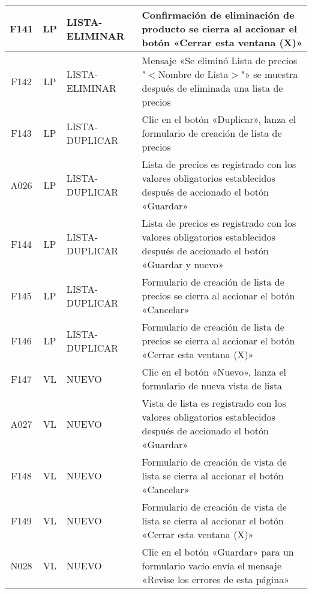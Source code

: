 \begin{landscape}
{\begin{longtable}[htb]{|c|c|p{3.8cm}|p{15.2cm}|}
\scriptsize{F141} & \scriptsize{LP} & \scriptsize{LISTA-ELIMINAR} & \scriptsize{Confirmación de eliminación de producto se cierra al accionar el botón «Cerrar esta ventana (X)»} \\ \hline
\scriptsize{F142} & \scriptsize{LP} & \scriptsize{LISTA-ELIMINAR} & \scriptsize{Mensaje «Se eliminó Lista de precios "$<$Nombre de Lista$>$"» se muestra después de eliminada una lista de precios} \\ \hline
\scriptsize{F143} & \scriptsize{LP} & \scriptsize{LISTA-DUPLICAR} & \scriptsize{Clic en el botón «Duplicar», lanza el formulario de creación de lista de precios} \\ \hline
\scriptsize{A026} & \scriptsize{LP} & \scriptsize{LISTA-DUPLICAR} & \scriptsize{Lista de precios es registrado con los valores obligatorios establecidos después de accionado el botón «Guardar»} \\ \hline
\scriptsize{F144} & \scriptsize{LP} & \scriptsize{LISTA-DUPLICAR} & \scriptsize{Lista de precios es registrado con los valores obligatorios establecidos después de accionado el botón «Guardar y nuevo»} \\ \hline
\scriptsize{F145} & \scriptsize{LP} & \scriptsize{LISTA-DUPLICAR} & \scriptsize{Formulario de creación de lista de precios se cierra al accionar el botón «Cancelar»} \\ \hline
\scriptsize{F146} & \scriptsize{LP} & \scriptsize{LISTA-DUPLICAR} & \scriptsize{Formulario de creación de lista de precios se cierra al accionar el botón «Cerrar esta ventana (X)»} \\ \hline
\scriptsize{F147} & \scriptsize{VL} & \scriptsize{NUEVO} & \scriptsize{Clic en el botón «Nuevo», lanza el formulario de nueva vista de lista} \\ \hline
\scriptsize{A027} & \scriptsize{VL} & \scriptsize{NUEVO} & \scriptsize{Vista de lista es registrado con los valores obligatorios establecidos después de accionado el botón «Guardar»} \\ \hline
\scriptsize{F148} & \scriptsize{VL} & \scriptsize{NUEVO} & \scriptsize{Formulario de creación de vista de lista se cierra al accionar el botón «Cancelar»} \\ \hline
\scriptsize{F149} & \scriptsize{VL} & \scriptsize{NUEVO} & \scriptsize{Formulario de creación de vista de lista se cierra al accionar el botón «Cerrar esta ventana (X)»} \\ \hline
\scriptsize{N028} & \scriptsize{VL} & \scriptsize{NUEVO} & \scriptsize{Clic en el botón «Guardar» para un formulario vacío envía el mensaje «Revise los errores de esta página»} \\ \hline

\end{longtable}}
\end{landscape}
